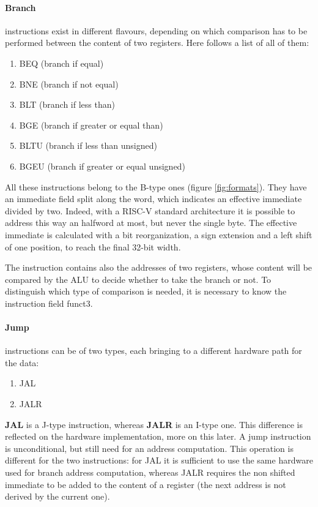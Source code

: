 \documentclass[a4paper]{article}
\begin{document}
\paragraph{Branch} instructions exist in different flavours, depending on which comparison has to be performed between the content of two registers. Here follows a list of all of them:
\begin{enumerate}
	\item BEQ (branch if equal)
	\item BNE (branch if not equal)
	\item BLT (branch if less than)
	\item BGE (branch if greater or equal than)
	\item BLTU (branch if less than unsigned)
	\item BGEU (branch if greater or equal unsigned)
\end{enumerate} 
All these instructions belong to the B-type ones (figure \ref{fig:formats}). They have an immediate field split along the word, which indicates an effective immediate divided by two. Indeed, with a RISC-V standard architecture it is possible to address this way an halfword at most, but never the single byte.
The effective immediate is calculated with a bit reorganization, a sign extension and a left shift of one position, to reach the final 32-bit width.

The instruction contains also the addresses of two registers, whose content will be compared by the ALU to decide whether to take the branch or not. 
To distinguish which type of comparison is needed, it is necessary to know the instruction field funct3.

\paragraph{Jump} instructions can be of two types, each bringing to a different hardware path for the data:
\begin{enumerate}
	\item JAL
	\item JALR
\end{enumerate}
\textbf{JAL} is a J-type instruction, whereas \textbf{JALR} is an I-type one. This difference is reflected on the hardware implementation, more on this later.
A jump instruction is unconditional, but still need for an address computation. This operation is different for the two instructions: for JAL it is sufficient to use the same hardware used for branch address computation, whereas JALR requires the non shifted immediate to be added to the content of a register (the next address is not derived by the current one).
\end{document}
